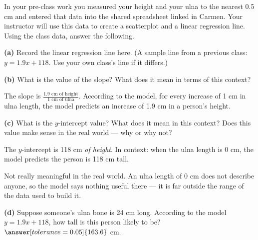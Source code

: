 \documentclass[12pt]{ximera}
\begin{document}
\begin{problem}
In your pre-class work you measured your height and your ulna to the nearest 0.5 cm
and entered that data into the shared spreadsheet linked in Carmen. Your instructor
will use this data to create a scatterplot and a linear regression line. Using the
class data, answer the following.

\begin{prompt}
\textbf{(a)} Record the linear regression line here. (A sample line from a previous
class: $y = 1.9x + 118$. Use your own class's line if it differs.)
\begin{freeResponse}
\end{freeResponse}
\end{prompt}

\begin{prompt}
\textbf{(b)} What is the value of the slope? What does it mean in terms of this
context?
\begin{freeResponse}
\end{freeResponse}

\begin{solution}
The slope is $\frac{1.9 \text{ cm of height}}{1 \text{ cm of ulna}}$. According to the
model, for every increase of 1 cm in ulna length, the model predicts an increase of
1.9 cm in a person's height.
\end{solution}
\end{prompt}

\begin{prompt}
\textbf{(c)} What is the $y$-intercept value? What does it mean in this context? Does
this value make sense in the real world --- why or why not?
\begin{freeResponse}
\end{freeResponse}

\begin{solution}
The $y$-intercept is 118 cm \emph{of height}. In context: when the ulna length is
0 cm, the model predicts the person is 118 cm tall.

Not really meaningful in the real world. An ulna length of 0 cm does not describe
anyone, so the model says nothing useful there --- it is far outside the range of the
data used to build it.
\end{solution}
\end{prompt}

\begin{prompt}
\textbf{(d)} Suppose someone's ulna bone is 24 cm long. According to the model
$y = 1.9x + 118$, how tall is this person likely to be?
$\answer[tolerance=0.05]{163.6}$ cm.


\end{prompt}
\end{problem}
\end{document}
